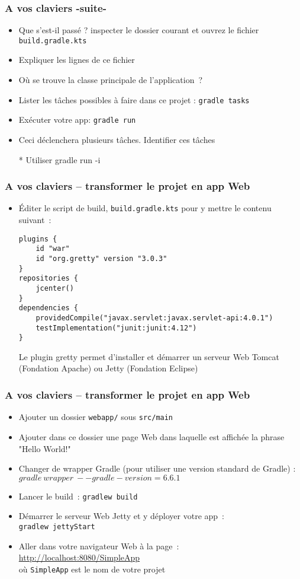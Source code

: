 \documentclass{beamer}
\begin{document}
\begin{frame}
\frametitle{A vos claviers -suite-}

\begin{itemize}
	\item Que s'est-il passé ? inspecter le dossier courant et ouvrez le fichier \texttt{build.gradle.kts}
	\item Expliquer les lignes de ce fichier
	\item Où se trouve la classe principale de l'application~?
	\item Lister les tâches possibles à faire dans ce projet : \texttt{gradle tasks}
	\item Exécuter votre app: \texttt{gradle run}
	\item Ceci déclenchera plusieurs tâches. Identifier ces tâches
	\item[*]Utiliser gradle run -i
	\end{itemize}
\end{frame}

\begin{frame}[fragile]
	\frametitle{A vos claviers -- transformer le projet en app Web}
	
	\begin{itemize}
		\item Éditer le script de build, \texttt{build.gradle.kts} pour y mettre le contenu suivant~:
		\footnotesize
\begin{lstlisting}
plugins {
	id "war"
	id "org.gretty" version "3.0.3"
}		
repositories {
	jcenter()
}
dependencies {
	providedCompile("javax.servlet:javax.servlet-api:4.0.1")
	testImplementation("junit:junit:4.12")
}	
\end{lstlisting}
		\normalsize
		\item[] Le plugin gretty permet d'installer et démarrer un serveur Web Tomcat (Fondation Apache) ou Jetty (Fondation Eclipse)
	\end{itemize}
\end{frame}

\begin{frame}
	\frametitle{A vos claviers -- transformer le projet en app Web}
	
	\begin{itemize}
		\item Ajouter un dossier \texttt{webapp/} sous \texttt{src/main}
		\item Ajouter dans ce dossier une page Web dans laquelle est affichée la phrase "Hello World!"
		\item Changer de wrapper Gradle (pour utiliser une version standard de Gradle) :
	$gradle~wrapper~--gradle-version=6.6.1$
	\item Lancer le build~: \texttt{gradlew build}
	\item Démarrer le serveur Web Jetty et y déployer votre app~:\\
	\texttt{gradlew jettyStart}
	\item Aller dans votre navigateur Web à la page~:\\
	\url{http://localhost:8080/SimpleApp}\\
	où \texttt{SimpleApp} est le nom de votre projet
	\end{itemize}
\end{frame}
\end{document}
